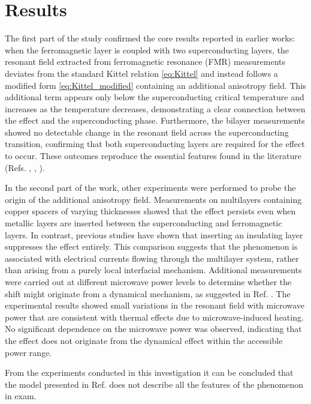 \documentclass[12pt,a4paper,oneside,openany]{book}
\begin{document}
\newpage

\section{Results}\label{Results}
The first part of the study confirmed the core results reported in earlier works: when the ferromagnetic layer is coupled with two superconducting layers, the resonant field extracted from ferromagnetic resonance (FMR) measurements deviates from the standard Kittel relation \eqref{eq:Kittel} and instead follows a modified form \eqref{eq:Kittel_modified} containing an additional anisotropy field. This additional term appears only below the superconducting critical temperature and increases as the temperature decreases, demonstrating a clear connection between the effect and the superconducting phase. Furthermore, the bilayer measurements showed no detectable change in the resonant field across the superconducting transition, confirming that both superconducting layers are required for the effect to occur. These outcomes reproduce the essential features found in the literature (Refs. \cite{Magnetization}, \cite{First_Evidence_1}, \cite{First_Evidence_2}).

In the second part of the work, other experiments were performed to probe the origin of the additional anisotropy field. Measurements on multilayers containing copper spacers of varying thicknesses showed that the effect persists even when metallic layers are inserted between the superconducting and ferromagnetic layers. In contrast, previous studies have shown that inserting an insulating layer suppresses the effect entirely. This comparison suggests that the phenomenon is associated with electrical currents flowing through the multilayer system, rather than arising from a purely local interfacial mechanism. Additional measurements were carried out at different microwave power levels to determine whether the shift might originate from a dynamical mechanism, as suggested in Ref. \cite{Russian}. The experimental results showed small variations in the resonant field with microwave power that are consistent with thermal effects due to microwave-induced heating. No significant dependence on the microwave power was observed, indicating that the effect does not originate from the dynamical effect within the accessible power range.

From the experiments conducted in this investigation it can be concluded that the model presented in Ref. \cite{Russian} does not describe all the features of the phenomenon in exam.
\end{document}
